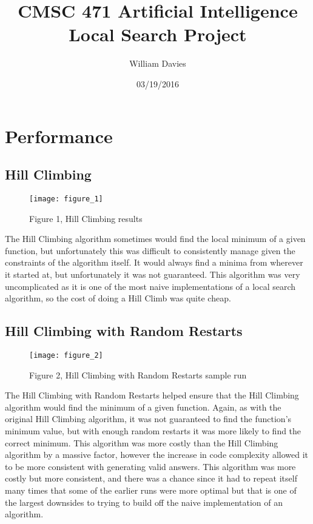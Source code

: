 \documentclass[12pt]{report}
\title{CMSC 471 Artificial Intelligence Local Search Project}
\author{William Davies}
\date{03/19/2016}
\begin{document}
\maketitle
\section{Performance}
\subsection{Hill Climbing}
\begin{figure}[h]
    \caption{Figure 1, Hill Climbing results}
    \centering
    \texttt{[image: figure\_1]}
\end{figure}
The Hill Climbing algorithm sometimes would find the local minimum of a given function, but unfortunately this was difficult to consistently manage given the constraints of the algorithm itself. It would always find a minima from wherever it started at, but unfortunately it was not guaranteed. This algorithm was very uncomplicated as it is one of the most naive implementations of a local search algorithm, so the cost of doing a Hill Climb was quite cheap.
\subsection{Hill Climbing with Random Restarts}
\begin{figure}[!ht]
    \caption{Figure 2, Hill Climbing with Random Restarts sample run}
    \centering
    \texttt{[image: figure\_2]}
\end{figure}
The Hill Climbing with Random Restarts helped ensure that the Hill Climbing algorithm would find the minimum of a given function. Again, as with the original Hill Climbing algorithm, it was not guaranteed to find the function's minimum value, but with enough random restarts it was more likely to find the correct minimum. This algorithm was more costly than the Hill Climbing algorithm by a massive factor, however the increase in code complexity allowed it to be more consistent with generating valid answers. This algorithm was more costly but more consistent, and there was a chance since it had to repeat itself many times that some of the earlier runs were more optimal but that is one of the largest downsides to trying to build off the naive implementation of an algorithm.
\FloatBarrier
\end{document}
